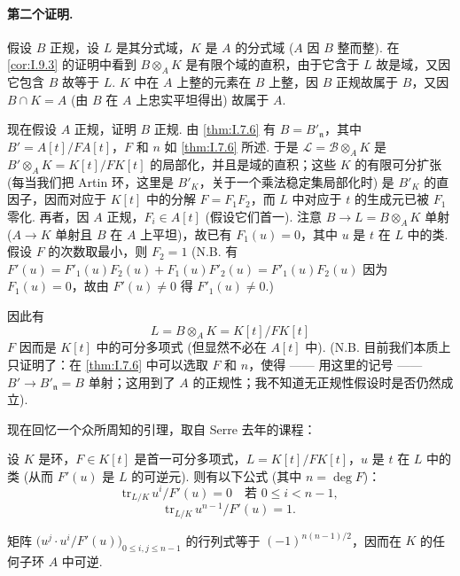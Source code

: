 \paragraph*{第二个证明.} 假设 $B$ 正规，设 $L$ 是其分式域，$K$ 是 $A$ 的分式域 ($A$ 因 $B$ 整而整). 在 \ref{cor:I.9.3} 的证明中看到 $B \otimes_A K$ 是有限个域的直积，由于它含于 $L$ 故是域，又因它包含 $B$ 故等于 $L$. $K$ 中在 $A$ 上整的元素在 $B$ 上整，因 $B$ 正规故属于 $B$，又因 $B \cap K = A$ (由 $B$ 在 $A$ 上忠实平坦得出) 故属于 $A$.

现在假设 $A$ 正规，证明 $B$ 正规. 由 \ref{thm:I.7.6} 有 $B = B'_{\mathfrak{n}}$，其中 $B' = A[t]/FA[t]$，$F$ 和 $n$ 如 \ref{thm:I.7.6} 所述. 于是 $\mathcal{L} = \mathcal{B} \otimes_A K$ 是 $B' \otimes_A K = K[t]/FK[t]$ 的局部化，并且是域的直积；这些 $K$ 的有限可分扩张 (每当我们把 Artin 环，这里是 $B'_K$，关于一个乘法稳定集局部化时) 是 $B'_K$ 的直因子，因而对应于 $K[t]$ 中的分解 $F = F_1 F_2$，而 $L$ 中对应于 $t$ 的生成元已被 $F_1$ 零化. 再者，因 $A$ 正规，$F_i \in A[t]$ (假设它们首一). 注意 $B \to L = B \otimes_A K$ 单射 ($A \to K$ 单射且 $B$ 在 $A$ 上平坦)，故已有 $F_1(u) = 0$，其中 $u$ 是 $t$ 在 $L$ 中的类. 假设 $F$ 的次数取最小，则 $F_2 = 1$ (N.B. 有 $F'(u) = F'_1(u)F_2(u) + F_1(u)F'_2(u) = F'_1(u)F_2(u)$ 因为 $F_1(u) = 0$，故由 $F'(u) \neq 0$ 得 $F'_1(u) \neq 0$.)

因此有
\begin{equation}
L = B \otimes_A K = K[t]/FK[t] \tag{($*$)}
\end{equation}
$F$ 因而是 $K[t]$ 中的可分多项式 (但显然不必在 $A[t]$ 中). (N.B. 目前我们本质上只证明了：在 \ref{thm:I.7.6} 中可以选取 $F$ 和 $n$，使得 —— 用这里的记号 —— $B' \to B'_{\mathfrak{n}} = B$ 单射；这用到了 $A$ 的正规性；我不知道无正规性假设时是否仍然成立).

现在回忆一个众所周知的引理，取自 Serre 去年的课程：

\begin{lemma}\label{lem:I.9.6}
设 $K$ 是环，$F \in K[t]$ 是首一可分多项式，$L = K[t]/FK[t]$，$u$ 是 $t$ 在 $L$ 中的类 (从而 $F'(u)$ 是 $L$ 的可逆元). 则有以下公式 (其中 $n = \deg F$)：
\[
\mathrm{tr}_{L/K}\, u^{i}/F'(u) = 0 \quad \text{若 } 0 \leqslant i < n - 1,
\]
\[
\mathrm{tr}_{L/K}\, u^{n-1}/F'(u) = 1.
\]
\end{lemma}

\begin{corollary}\label{cor:I.9.7}
矩阵 $\bigl(u^{j} \cdot u^{i}/F'(u)\bigr)_{0 \leqslant i, j \leqslant n-1}$ 的行列式等于 $(-1)^{n(n-1)/2}$，因而在 $K$ 的任何子环 $A$ 中可逆.
\end{corollary}

